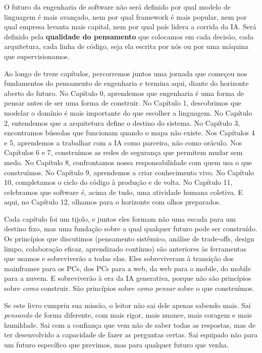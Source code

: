 O futuro da engenharia de software não será definido por qual modelo
de linguagem é mais avançado, nem por qual framework é mais popular,
nem por qual empresa levanta mais capital, nem por qual país lidera a
corrida da IA. Será definido pela \textbf{qualidade do pensamento} que
colocamos em cada decisão, cada arquitetura, cada linha de código,
seja ela escrita por nós ou por uma máquina que supervisionamos.

Ao longo de treze capítulos, percorremos juntos uma jornada que
começou nos fundamentos do pensamento de engenharia e termina aqui,
diante do horizonte aberto do futuro. No Capítulo 0, aprendemos que
engenharia é uma forma de pensar antes de ser uma forma de construir.
No Capítulo 1, descobrimos que modelar o domínio é mais importante do
que escolher a linguagem. No Capítulo 2, entendemos que a arquitetura
define o destino do sistema. No Capítulo 3, encontramos bússolas que
funcionam quando o mapa não existe. Nos Capítulos 4 e 5, aprendemos a
trabalhar com a IA como parceira, não como oráculo. Nos Capítulos 6 e
7, construímos as redes de segurança que permitem mudar sem medo. No
Capítulo 8, confrontamos nossa responsabilidade com quem usa o que
construímos. No Capítulo 9, aprendemos a criar conhecimento vivo. No
Capítulo 10, completamos o ciclo do código à produção e de volta. No
Capítulo 11, celebramos que software é, acima de tudo, uma atividade
humana coletiva. E aqui, no Capítulo 12, olhamos para o horizonte com
olhos preparados.

Cada capítulo foi um tijolo, e juntos eles formam não uma escada para
um destino fixo, mas uma fundação sobre a qual qualquer futuro pode ser
construído. Os princípios que discutimos (pensamento sistêmico,
análise de trade-offs, design limpo, colaboração eficaz, aprendizado
contínuo) são anteriores às ferramentas que usamos e sobreviverão a
todas elas. Eles sobreviveram à transição dos mainframes para os PCs,
dos PCs para a web, da web para o mobile, do mobile para a nuvem. E
sobreviverão à era da IA generativa, porque não são princípios sobre
\textit{como} construir. São princípios sobre \textit{como pensar}
sobre o que construímos.

Se este livro cumpriu sua missão, o leitor não sai dele apenas sabendo
mais. Sai \textit{pensando} de forma diferente, com mais rigor, mais
nuance, mais coragem e mais humildade. Sai com a confiança que vem não
de saber todas as respostas, mas de ter desenvolvido a capacidade de
fazer as perguntas certas. Sai equipado não para um futuro específico
que previmos, mas para qualquer futuro que venha.

